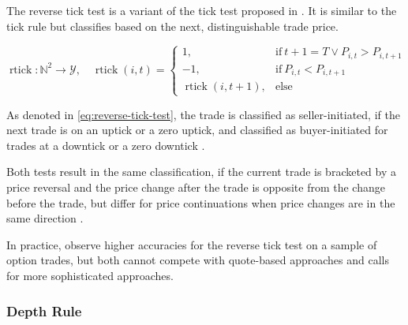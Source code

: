 
The reverse tick test is a variant of the tick test proposed in \textcite[][241]{hasbrouckTradesQuotesInventories1988}. It is similar to the tick rule but classifies based on the next, distinguishable trade price.

\begin{equation}
    \operatorname{rtick} \colon \mathbb{N}^2 \to \mathcal{Y},\quad
    \operatorname{rtick}(i, t)=
    \begin{cases}
        1,                            & \text{if}\ t+1=T \lor P_{i, t} > P_{i, t+1} \\
        -1,                           & \text{if}\ P_{i, t} < P_{i, t+1}            \\
        \operatorname{rtick}(i, t+1), & \text{else}
    \end{cases}
    \label{eq:reverse-tick-test}
\end{equation}

As denoted in \cref{eq:reverse-tick-test}, the trade is classified as seller-initiated, if the next trade is on an uptick or a zero uptick, and classified as buyer-initiated for trades at a downtick or a zero downtick \autocite[][735--636]{leeInferringTradeDirection1991}.

Both tests result in the same classification, if the current trade is bracketed by a price reversal and the price change after the trade is opposite from the change before the trade, but differ for price continuations when price changes are in the same direction \autocite[][736]{leeInferringTradeDirection1991}.

In practice, \textcite[][29--32]{grauerOptionTradeClassification2022} observe higher accuracies for the reverse tick test on a sample of option trades, but both cannot compete with quote-based approaches and calls for more sophisticated approaches.

\subsubsection{Depth Rule}\label{sec:depth-rule}


